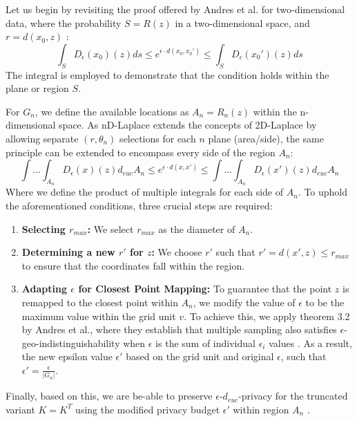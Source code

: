 Let us begin by revisiting the proof offered by Andres et al. for two-dimensional data, 
where the probability $S = R(z)$ in a two-dimensional space, and $r = d(x_0, z)$ \citep{DBLP:journals/corr/abs-1212-1984}:
\begin{equation}
     \int_{S} D_\epsilon(x_0)(z)ds \leq e^{\epsilon \cdot d(x_0, x_0')} \leq \int_{S} D_\epsilon(x_0')(z)ds
\end{equation}
The integral is employed to demonstrate that the condition holds within the plane or region $S$.

For $G_n$, we define the available locations as $A_n = R_n(z)$ within the n-dimensional space. As nD-Laplace extends the concepts of 2D-Laplace by allowing separate $(r, \theta_n)$ selections for each $n$ plane (area/side), the same principle can be extended to encompass every side of the region $A_n$:
\begin{equation}
    \int ... \int_{A_n} D_{\epsilon}(x)(z)d_{euc}A_n \leq e^{\epsilon \cdot d(x, x')} \leq \int ... \int_{A_n} D_{\epsilon}(x')(z)d_{euc}A_n
\end{equation}
Where we define the product of multiple integrals for each side of $A_n$.
To uphold the aforementioned conditions, three crucial steps are required:
\begin{enumerate}
\item \textbf{Selecting $r_{max}$:} We select $r_{max}$ as the diameter of $A_n$.
\item \textbf{Determining a new $r'$ for $z$:} We choose $r'$ such that $r' = d(x', z) \leq r_{max}$ to ensure that the coordinates fall within the region.
\item \textbf{Adapting $\epsilon$ for Closest Point Mapping: }To guarantee that the point $z$ is remapped to the closest point within $A_n$, we modify the value of $\epsilon$ to be the maximum value within the grid unit $v$. To achieve this, we apply theorem 3.2 by Andres et al., where they establish that multiple sampling also satisfies $\epsilon$-geo-indistinguishability when $\epsilon$ is the sum of individual $\epsilon_i$ values \citep{DBLP:journals/corr/abs-1212-1984}. As a result, the new epsilon value $\epsilon'$ based on the grid unit and original $\epsilon$, such that $\epsilon' = \frac{\epsilon}{|G_n|}$.
\end{enumerate}
Finally, based on this, we are be-able to preserve $\epsilon$-$d_{euc}$-privacy for the truncated variant $K = K^T$ using the modified privacy budget $\epsilon'$ within region $A_n$ \citep{9646489, DBLP:journals/corr/abs-1212-1984}.
